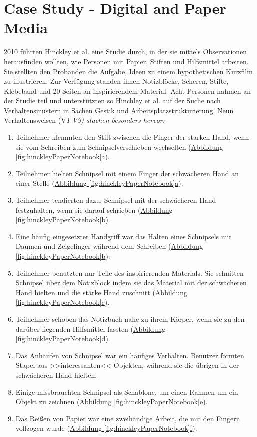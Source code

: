 \section{Case Study - Digital and Paper Media}

2010 führten Hinckley et al. eine Studie durch, in der sie mittels Observationen herausfinden wollten, wie Personen mit Papier, Stiften und Hilfsmittel arbeiten. Sie stellten den Probanden die Aufgabe, Ideen zu einem hypothetischen Kurzfilm zu illustrieren. Zur Verfügung standen ihnen Notizblöcke, Scheren, Stifte, Klebeband und 20 Seiten an inspirierendem Material. Acht Personen nahmen an der Studie teil und unterstützten so Hinchley et al. auf der Suche nach Verhaltensmustern in Sachen Gestik und Arbeitsplatzstrukturierung. Neun Verhaltensweisen (V\itshape 1\upshape-V\itshape 9\upshape) stachen besonders hervor:

\medskip \begin{enumerate}
	\item Teilnehmer klemmten den Stift zwischen die Finger der starken Hand, wenn sie vom Schreiben zum Schnipselverschieben wechselten (\hyperref[fig:hinckleyPaperNotebook]{Abbildung \ref*{fig:hinckleyPaperNotebook}a}).
	\item Teilnehmer hielten Schnipsel mit einem Finger der schwächeren Hand an einer Stelle (\hyperref[fig:hinckleyPaperNotebook]{Abbildung \ref*{fig:hinckleyPaperNotebook}a}).
	\item Teilnehmer tendierten dazu, Schnipsel mit der schwächeren Hand festzuhalten, wenn sie darauf schrieben (\hyperref[fig:hinckleyPaperNotebook]{Abbildung \ref*{fig:hinckleyPaperNotebook}b}).
	\item Eine häufig eingesetzter Handgriff war das Halten eines Schnipsels mit Daumen und Zeigefinger während dem Schreiben (\hyperref[fig:hinckleyPaperNotebook]{Abbildung \ref*{fig:hinckleyPaperNotebook}b}).
	\item Teilnehmer benutzten nur Teile des inspirierenden Materials. Sie schnitten Schnipsel über dem Notizblock indem sie das Material mit der schwächeren Hand hielten und die stärke Hand zuschnitt (\hyperref[fig:hinckleyPaperNotebook]{Abbildung \ref*{fig:hinckleyPaperNotebook}c}).
	\item Teilnehmer schoben das Notizbuch nahe zu ihrem Körper, wenn sie zu den darüber liegenden Hilfsmittel fassten (\hyperref[fig:hinckleyPaperNotebook]{Abbildung \ref*{fig:hinckleyPaperNotebook}d}).
	\item Das Anhäufen von Schnipsel war ein häufiges Verhalten. Benutzer formten Stapel aus >>interessanten<< Objekten, während sie die übrigen in der schwächeren Hand hielten.
	\item Einige missbrauchten Schnipsel als Schablone, um einen Rahmen um ein Objekt zu zeichnen (\hyperref[fig:hinckleyPaperNotebook]{Abbildung \ref*{fig:hinckleyPaperNotebook}e}).
	\item Das Reißen von Papier war eine zweihändige Arbeit, die mit den Fingern vollzogen wurde (\hyperref[fig:hinckleyPaperNotebook]{Abbildung \ref*{fig:hinckleyPaperNotebook}f}).
\end{enumerate}

